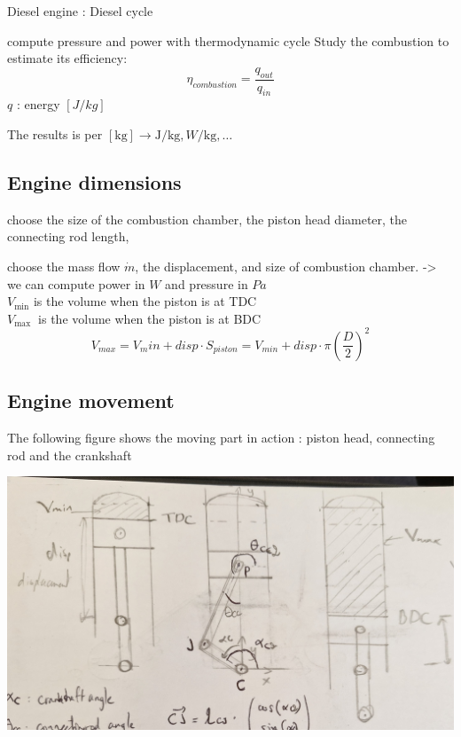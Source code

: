 \documentclass[12pt,a4paper]{article}
\begin{document}
	Diesel engine : Diesel cycle
	
	compute pressure and power with thermodynamic cycle
	Study the combustion to estimate its efficiency:
	\begin{equation*}
		\eta_{combustion}=\frac{q_{out}}{q_{in}} \tag{1}
	\end{equation*}	
	$q$ : energy $[J / kg]$
	
	The results is per $[\mathrm{kg}] \rightarrow \mathrm{J} / \mathrm{kg}, W / \mathrm{kg}, \ldots$\\
	
	\subsection{Engine dimensions}
	choose the size of the combustion chamber, the piston head diameter, the connecting rod length, 
	
	choose the mass flow $\dot{m}$, the displacement, and size of combustion chamber. -> we can compute power in $W$ and pressure in $Pa$\\
	$V_{\min }$ is the volume when the piston is at TDC\\
	$V_{\text {max }}$ is the volume when the piston is at BDC\\
	
	\begin{equation}
		V_{max} = V_min + disp \cdot S_{piston} = V_{min} + disp \cdot \pi (\frac{D}{2})^2
	\end{equation}
	
	\subsection{Engine movement}
	The following figure shows the moving part in action : piston head, connecting rod and the crankshaft
	
	\includegraphics[scale=.2]{Engine_schema.jpg}
	
\end{document}
